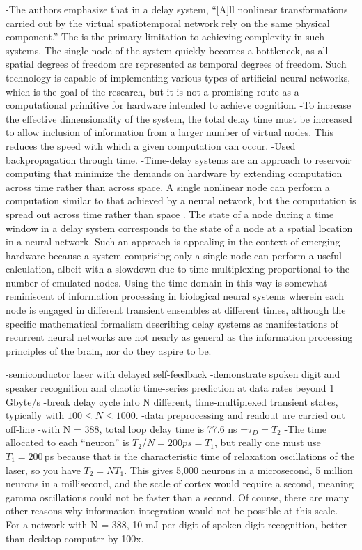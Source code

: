 -The authors emphasize that in a delay system, ``[A]ll nonlinear transformations carried out by the virtual spatiotemporal network rely on the same physical component.'' The is the primary limitation to achieving complexity in such systems. The single node of the system quickly becomes a bottleneck, as all spatial degrees of freedom are represented as temporal degrees of freedom. Such technology is capable of implementing various types of artificial neural networks, which is the goal of the research, but it is not a promising route as a computational primitive for hardware intended to achieve cognition.
-To increase the effective dimensionality of the system, the total delay time must be increased to allow inclusion of information from a larger number of virtual nodes. This reduces the speed with which a given computation can occur.
-Used backpropagation through time.
-Time-delay systems are an approach to reservoir computing that minimize the demands on hardware by extending computation across time rather than across space. A single nonlinear node can perform a computation similar to that achieved by a neural network, but the computation is spread out across time rather than space \cite{brpe2018}. The state of a node during a time window in a delay system corresponds to the state of a node at a spatial location in a neural network. Such an approach is appealing in the context of emerging hardware because a system comprising only a single node can perform a useful calculation, albeit with a slowdown due to time multiplexing proportional to the number of emulated nodes. Using the time domain in this way is somewhat reminiscent of information processing in biological neural systems wherein each node is engaged in different transient ensembles at different times, although the specific mathematical formalism describing delay systems as manifestations of recurrent neural networks are not nearly as general as the information processing principles of the brain, nor do they aspire to be.


\vspace{3em}
\cite{brso2013}
-semiconductor laser with delayed self-feedback
-demonstrate spoken digit and speaker recognition and chaotic time-series prediction at data rates beyond 1 Gbyte/s
-break delay cycle into N different, time-multiplexed transient states, typically with $100\le N \le 1000$.
-data preprocessing and readout are carried out off-line
-with N = 388, total loop delay time is 77.6 ns =$\tau_D = T_2$
-The time allocated to each ``neuron'' is $T_2/N = 200ps = T_1$, but really one must use $T_1 = 200$\,ps because that is the characteristic time of relaxation oscillations of the laser, so you have $T_2 = NT_1$. This gives 5,000 neurons in a microsecond, 5 million neurons in a millisecond, and the scale of cortex would require a second, meaning gamma oscillations could not be faster than a second. Of course, there are many other reasons why information integration would not be possible at this scale.
-For a network with N = 388, 10 mJ per digit of spoken digit recognition, better than desktop computer by 100x.


